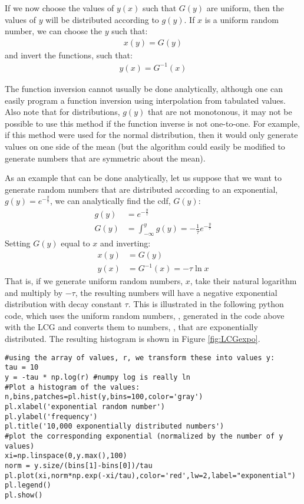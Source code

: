 If we now choose the values of $y(x)$ such that $G(y)$ are uniform, then the values of $y$ will be distributed according to $g(y)$. If $x$ is a uniform random number, we can choose the $y$ such that:
\begin{align*}
x(y) = G(y)
\end{align*}
and invert the functions, such that:
\begin{align*}
y(x) = G^{-1}(x)
\end{align*}

The function inversion cannot usually be done analytically, although one can easily program a function inversion using interpolation from tabulated values. Also note that for distributions, $g(y)$ that are not monotonous, it may not be possible to use this method if the function inverse is not one-to-one. For example, if this method were used for the normal distribution, then it would only generate values on one side of the mean (but the algorithm could easily be modified to generate numbers that are symmetric about the mean).

As an example that can be done analytically, let us suppose that we want to generate random numbers that are distributed according to an exponential, $g(y) = e^{-\frac{y}{\tau}}$, we can analytically find the cdf, $G(y)$:
\begin{align*}
g(y) &= e^{-\frac{y}{\tau}}\nonumber\\
G(y) &= \int_{-\infty}^y g(y) = -\frac{1}{\tau} e^{-\frac{y}{\tau}}
\end{align*}
Setting $G(y)$ equal to $x$ and inverting:
\begin{align*}
x(y) &= G(y)\\
y(x) &= G^{-1}(x) = -\tau \ln{x} 
\end{align*}
That is, if we generate uniform random numbers, $x$, take their natural logarithm and multiply by $-\tau$, the resulting numbers will have a negative exponential distribution with decay constant $\tau$. This is illustrated in the following python code, which uses the uniform random numbers, , generated in the code above with the LCG and converts them to numbers, , that are exponentially distributed. The resulting histogram is shown in Figure \ref{fig:LCGexpo}.

\begin{lstlisting}[frame=single] 
#using the array of values, r, we transform these into values y:
tau = 10
y = -tau * np.log(r) #numpy log is really ln
#Plot a histogram of the values:
n,bins,patches=pl.hist(y,bins=100,color='gray')
pl.xlabel('exponential random number')
pl.ylabel('frequency')
pl.title('10,000 exponentially distributed numbers')
#plot the corresponding exponential (normalized by the number of y values)
xi=np.linspace(0,y.max(),100)
norm = y.size/(bins[1]-bins[0])/tau
pl.plot(xi,norm*np.exp(-xi/tau),color='red',lw=2,label="exponential")
pl.legend()
pl.show()
\end{lstlisting}

